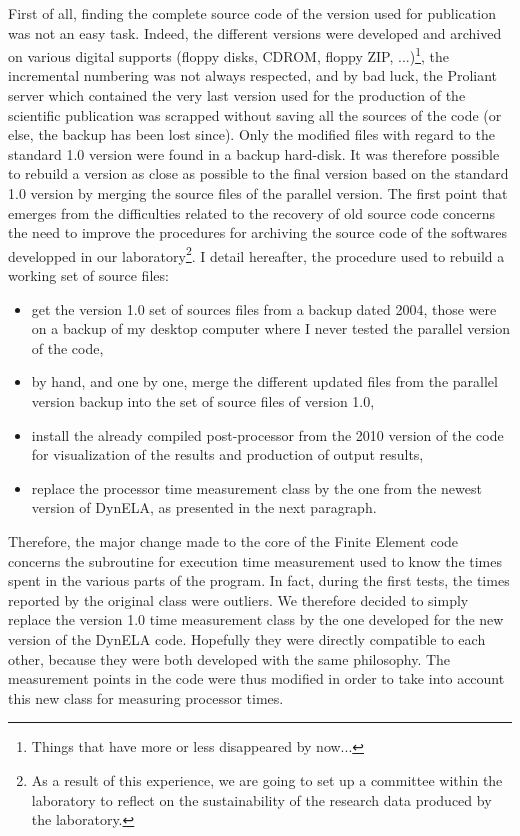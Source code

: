 First of all, finding the complete source code of the version used for publication was not an easy task. Indeed, the different versions were developed and archived on various digital supports (floppy disks, CDROM, floppy ZIP, ...)\footnote{Things that have more or less disappeared by now...}, the incremental numbering was not always respected, and by bad luck, the Proliant server which contained the very last version used for the production of the scientific publication was scrapped without saving all the sources of the code (or else, the backup has been lost since). Only the modified files with regard to the standard 1.0 version were found in a backup hard-disk. It was therefore possible to rebuild a version as close as possible to the final version based on the standard 1.0 version by merging the source files of the parallel version. The first point that emerges from the difficulties related to the recovery of old source code concerns the need to improve the procedures for archiving the source code of the softwares developped in our laboratory\footnote{As a result of this experience, we are going to set up a committee within the laboratory to reflect on the sustainability of the research data produced by the laboratory.}. I detail hereafter, the procedure used to rebuild a working set of source files:
\begin{itemize}
\item get the version 1.0 set of sources files from a backup dated 2004, those were on a backup of my desktop computer where I never tested the parallel version of the code,
\item by hand, and one by one, merge the different updated files from the parallel version backup into the set of source files of version 1.0,
\item install the already compiled post-processor from the 2010 version of the code for visualization of the results and production of output results,
\item replace the processor time measurement class by the one from the newest version of DynELA, as presented in the next paragraph.
\end{itemize}

Therefore, the major change made to the core of the Finite Element code concerns the subroutine for execution time measurement used to know the times spent in the various parts of the program. In fact, during the first tests, the times reported by the original class were outliers. We therefore decided to simply replace the version 1.0 time measurement class by the one developed for the new version of the DynELA code. Hopefully they were directly compatible to each other, because they were both developed with the same philosophy. The measurement points in the code were thus modified in order to take into account this new class for measuring processor times.

